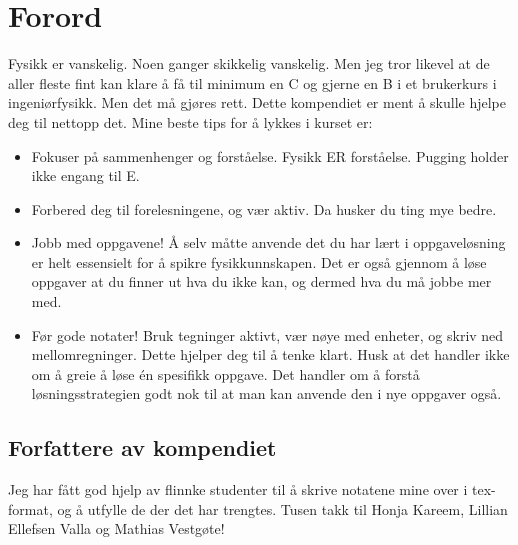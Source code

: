\documentclass[../Main.tex]{subfiles}
\begin{document}
\chapter*{Forord}
Fysikk er vanskelig. Noen ganger skikkelig vanskelig. Men jeg tror likevel at de aller fleste fint kan klare å få til minimum en C og gjerne en B i et brukerkurs i ingeniørfysikk. Men det må gjøres rett. Dette kompendiet er ment å skulle hjelpe deg til nettopp det. Mine beste tips for å lykkes i kurset er:
\begin{itemize}
    \item Fokuser på sammenhenger og forståelse. Fysikk ER forståelse. Pugging holder ikke engang til E.
    \item Forbered deg til forelesningene, og vær aktiv. Da husker du ting mye bedre.
    \item Jobb med oppgavene! Å selv måtte anvende det du har lært i oppgaveløsning er helt essensielt for å spikre fysikkunnskapen. Det er også gjennom å løse oppgaver at du finner ut hva du ikke kan, og dermed hva du må jobbe mer med.
    \item Før gode notater! Bruk tegninger aktivt, vær nøye med enheter, og skriv ned mellomregninger. Dette hjelper deg til å tenke klart. Husk at det handler ikke om å greie å løse én spesifikk oppgave. Det handler om å forstå løsningsstrategien godt nok til at man kan anvende den i nye oppgaver også.
\end{itemize}
\section*{Forfattere av kompendiet}
Jeg har fått god hjelp av flinnke studenter til å skrive notatene mine over i tex-format, og å utfylle de der det har trengtes. Tusen takk til Honja Kareem,  Lillian Ellefsen Valla og Mathias Vestgøte!
\end{document}
